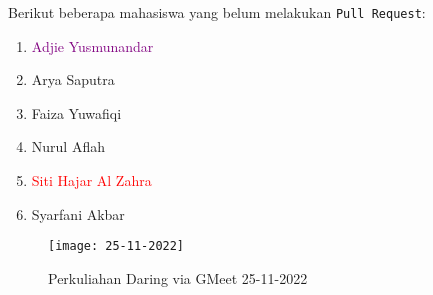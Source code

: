 \documentclass[a4paper]{tufte-handout}
\begin{document}
\noindent
Berikut beberapa mahasiswa yang belum melakukan {\tt Pull Request}:
\begin{multicols}{2}
\begin{enumerate}
\item \textcolor{purple}{Adjie Yusmunandar}
\item Arya Saputra
\item Faiza Yuwafiqi
\item Nurul Aflah
\item \textcolor{red}{Siti Hajar Al Zahra}
\item Syarfani Akbar
\end{enumerate}
\end{multicols}

\begin{figure}[!ht]
\texttt{[image: 25-11-2022]}
\caption{Perkuliahan Daring via GMeet 25-11-2022}
\label{gam:form-ssh}
\end{figure}

\clearpage
{}

\end{document}
